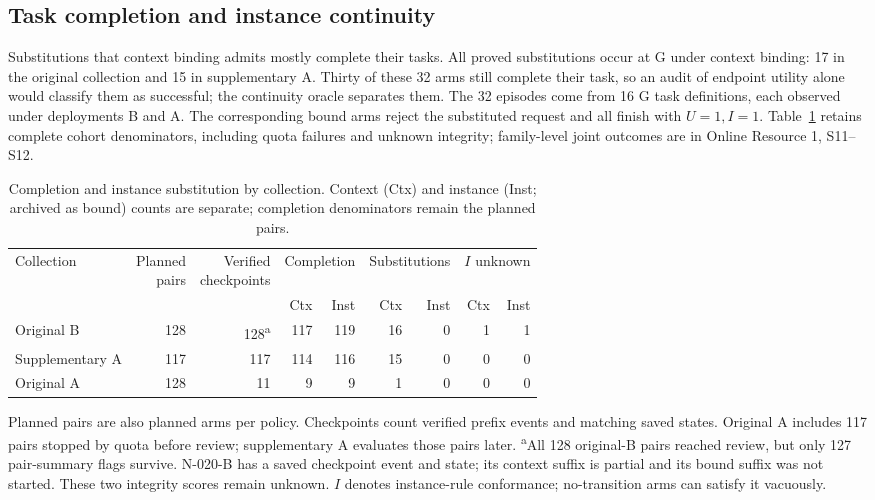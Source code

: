 \documentclass[pdflatex,sn-basic]{sn-jnl}
\begin{document}
\subsection{Task completion and instance continuity}\label{continuity-and-task-completion}

Substitutions that context binding admits mostly complete their tasks. All proved substitutions occur at G under context binding: 17 in the original collection and 15 in supplementary A. Thirty of these 32 arms still complete their task, so an audit of endpoint utility alone would classify them as successful; the continuity oracle separates them. The 32 episodes come from 16 G task definitions, each observed under deployments B and A. The corresponding bound arms reject the substituted request and all finish with \(U=1,I=1\). Table~\ref{tab:outcomes} retains complete cohort denominators, including quota failures and unknown integrity; family-level joint outcomes are in Online Resource 1, S11--S12.

\begin{table}[tbp]
\caption{Completion and instance substitution by collection. Context (Ctx) and instance (Inst; archived as bound) counts are separate; completion denominators remain the planned pairs.}\label{tab:outcomes}
\centering\small
\setlength{\tabcolsep}{2pt}
\begin{tabular*}{\textwidth}{@{\extracolsep{\fill}}lrrrrrrrr@{}}
\toprule
Collection & \shortstack{Planned\\pairs} & \shortstack{Verified\\checkpoints} & \multicolumn{2}{c}{Completion} & \multicolumn{2}{c}{Substitutions} & \multicolumn{2}{c}{$I$ unknown} \\
\cmidrule(lr){4-5}\cmidrule(lr){6-7}\cmidrule(lr){8-9}
 & & & Ctx & Inst & Ctx & Inst & Ctx & Inst \\
\midrule
Original B & 128 & 128\textsuperscript{a} & 117 & 119 & 16 & 0 & 1 & 1 \\
Supplementary A & 117 & 117 & 114 & 116 & 15 & 0 & 0 & 0 \\
Original A & 128 & 11 & 9 & 9 & 1 & 0 & 0 & 0 \\
\bottomrule
\end{tabular*}
\par\smallskip\begin{minipage}{\textwidth}\small Planned pairs are also planned arms per policy. Checkpoints count verified prefix events and matching saved states. Original A includes 117 pairs stopped by quota before review; supplementary A evaluates those pairs later. \textsuperscript{a}All 128 original-B pairs reached review, but only 127 pair-summary flags survive. N-020-B has a saved checkpoint event and state; its context suffix is partial and its bound suffix was not started. These two integrity scores remain unknown. $I$ denotes instance-rule conformance; no-transition arms can satisfy it vacuously.\end{minipage}
\end{table}
\end{document}
